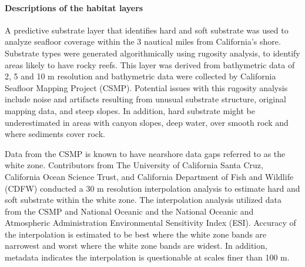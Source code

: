 \documentclass[11pt,
  english,
  letterpaper,
]{article}
\begin{document}
\leavevmode\tagmcend\tagstructend


\hypertarget{descriptions-of-the-habitat-layers}{%
\paragraph{Descriptions of the habitat layers}\label{descriptions-of-the-habitat-layers}}

\leavevmode\tagmcend\tagstructend


A predictive substrate layer that identifies hard and soft substrate was used to analyze seafloor coverage within the 3 nautical miles from California's shore. Substrate types were generated algorithmically using rugosity analysis, to identify areas likely to have rocky reefs. This layer was derived from bathymetric data of 2, 5 and 10 m resolution and bathymetric data were collected by California Seafloor Mapping Project (CSMP). Potential issues with this rugosity analysis include noise and artifacts resulting from unusual substrate structure, original mapping data, and steep slopes. In addition, hard substrate might be underestimated in areas with canyon slopes, deep water, over smooth rock and where sediments cover rock.

\leavevmode\tagmcend\tagstructend\par


Data from the CSMP is known to have nearshore data gaps referred to as the white zone. Contributors from The University of California Santa Cruz, California Ocean Science Trust, and California Department of Fish and Wildlife (CDFW) conducted a 30 m resolution interpolation analysis to estimate hard and soft substrate within the white zone. The interpolation analysis utilized data from the CSMP and National Oceanic and the National Oceanic and Atmospheric Administration Environmental Sensitivity Index (ESI). Accuracy of the interpolation is estimated to be best where the white zone bands are narrowest and worst where the white zone bands are widest. In addition, metadata indicates the interpolation is questionable at scales finer than 100 m.

\leavevmode\tagmcend\tagstructend\par

\end{document}
